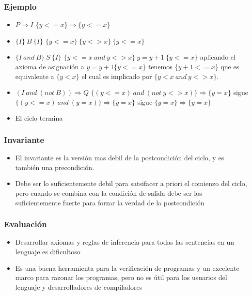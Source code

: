 \documentclass[11pt]{article}
\begin{document}
\subsubsection*{Ejemplo}
\label{sec:org14ae29b}
\begin{itemize}
\item \(P \Rightarrow I\) \(\{y <= x \} \Rightarrow \{y <= x \}\)
\item \(\{I\} \ B \ \{I\}\)  \(\{y <= x \} \ \{y <> x \}  \ \{y <= x\}\)
\item \(\{I \ and \ B \} \ S \ \{I\}\) \(\{y <= x \ and \ y <> x \}
    \ y = y + 1 \ \{y <= x\}\) aplicando el axioma de asignación a \(y
    = y + 1 \{ y <= x \}\) tenemos \(\{y + 1 <= x \}\) que es
equivalente a \(\{y < x \}\) el cual es implicado por \(\{y < x
    \ and \ y <> x\}\).
\item \((I \ and \ (not \ B)) \Rightarrow Q\) \(\{(y <= x) \ and \ (not
    \ y <> x)\} \Rightarrow \{y = x\}\) sigue \(\{(y <= x) \ and \ (y
    = x)\} \Rightarrow \{y = x\}\) sigue \(\{y = x \} \Rightarrow \{y = x\}\)
\item El ciclo termina
\end{itemize}


\subsubsection*{Invariante}
\label{sec:orgc4cdb92}
\begin{itemize}
\item El invariante es la versión mas debil de la postcondición del ciclo,
y es también una precondición.
\item Debe ser lo suficientemente debil para satsifacer a priori el
comienzo del ciclo, pero cuando se combina con la condición de
salida debe ser los suficientemente fuerte para forzar la verdad de
la postcondición
\end{itemize}

\subsubsection*{Evaluación}
\label{sec:org97ed19a}
\begin{itemize}
\item Desarrollar axiomas y reglas de inferencia para todas las
sentencias en un lenguaje es dificultoso
\item Es una buena herramienta para la verificación de programas y un
excelente marco para razonar los programas, pero no es útil para los
usuarios del lenguaje y desarrolladores de compiladores
\end{itemize}
\end{document}
